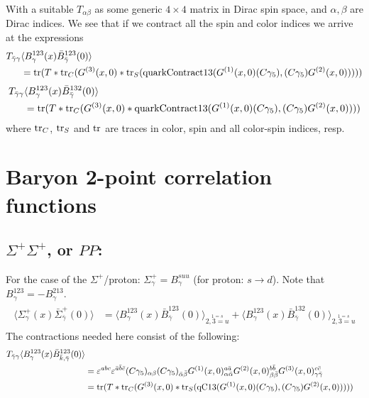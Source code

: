 \documentclass[12pt]{article}
\begin{document}
With a suitable $T_{\alpha\beta}$ as some generic $4\times 4$ matrix in
Dirac spin space, and $\alpha,\beta$ are Dirac indices. We see that 
if we contract all the spin and color indices we arrive at the expressions
%
\begin{gather*}
\begin{split}
T_{\bar{\gamma}\gamma}& \langle B^{123}_\gamma(x) \bar{B}^{123}_{\bar\gamma}(0)\rangle\\
 &= {\rm tr}(T * {\rm tr}_C(G^{(3)}(x,0)
  * {\rm tr}_S({\rm quarkContract13}(G^{(1)}(x,0)(C\gamma_5),(C\gamma_5)G^{(2)}(x,0)))))
\end{split}
\end{gather*}
%
\begin{gather*}
\begin{split}
T_{\bar{\gamma}\gamma}& \langle B^{123}_\gamma(x) \bar{B}^{132}_{\bar\gamma}(0)\rangle\\
 &= {\rm tr}(T * {\rm tr}_C(G^{(3)}(x,0)
  * {\rm quarkContract13}(G^{(1)}(x,0)(C\gamma_5),(C\gamma_5)G^{(2)}(x,0))))
\end{split}
\end{gather*}
%
where ${\rm tr}_C$, ${\rm tr}_S$ and ${\rm tr}$ are traces in 
color, spin and all color-spin indices, resp.

\newpage

\section{Baryon 2-point correlation functions}

\subsection{$\Sigma^+\Sigma^+$, or $PP$:}
For the case of the $\Sigma^+$/proton: $\Sigma^+_\gamma = B^{suu}_\gamma$ 
(for proton: $s\rightarrow d$). Note that $B^{123}_\gamma = -B^{213}_\gamma$.
%
\begin{gather*}
\begin{split}
\langle \Sigma^+_\gamma(x) \bar{\Sigma}^+_{\bar\gamma}(0)\rangle
 &= \langle B^{123}_\gamma(x) \bar{B}^{123}_{\bar\gamma}(0)\rangle_{\stackrel{1=s}{2,3=u}}
  + \langle B^{123}_\gamma(x) \bar{B}^{132}_{\bar\gamma}(0)\rangle_{\stackrel{1=s}{2,3=u}}
\end{split}
\end{gather*}
The contractions needed here consist of the following:
%
\begin{gather*}
\begin{split}
T_{\bar{\gamma}\gamma} \langle B^{123}_\gamma(x) \bar{B}^{123}_{\bar{k},\bar{\gamma}}(0)\rangle\\
 &= \varepsilon^{abc}\varepsilon^{\bar{a}\bar{b}\bar{c}} 
    (C\gamma_5)_{\alpha\beta} (C\gamma_5)_{\bar{\alpha}\bar{\beta}}
    G^{(1)}(x,0)^{a\bar{a}}_{\alpha\bar{\alpha}}
    G^{(2)}(x,0)^{b\bar{b}}_{\beta\bar{\beta}}
    G^{(3)}(x,0)^{c\bar{c}}_{\gamma\bar{\gamma}}\\
 &= {\rm tr}(T * {\rm tr}_C(G^{(3)}(x,0)
  * {\rm tr}_S({\rm qC13}(G^{(1)}(x,0)(C\gamma_5),(C\gamma_5)G^{(2)}(x,0)))))
\end{split}
\end{gather*}
\end{document}
